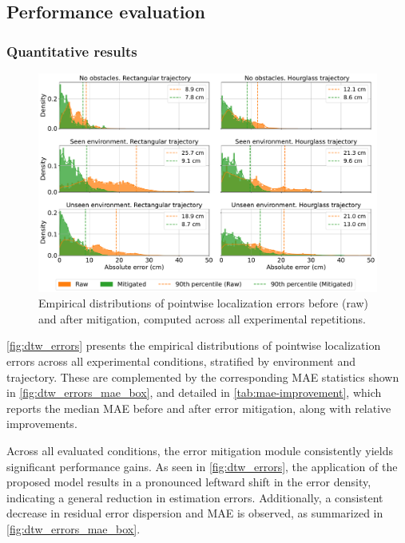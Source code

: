 \subsection{Performance evaluation}
\subsubsection{Quantitative results}

\begin{figure}[tbh]
    \centering
    \includegraphics[width=\textwidth]{Graphics/dtw_errors.pdf}
    \caption[Empirical distributions of localization errors before and after mitigation.]{Empirical distributions of pointwise localization errors before (raw) and after mitigation, computed across all experimental repetitions.}
    \label{fig:dtw_errors}
\end{figure}

\autoref{fig:dtw_errors} presents the empirical distributions of pointwise localization errors across all experimental conditions, stratified by environment and trajectory. These are complemented by the corresponding MAE statistics shown in \autoref{fig:dtw_errors_mae_box}, and detailed in \autoref{tab:mae-improvement}, which reports the median MAE before and after error mitigation, along with relative improvements.

Across all evaluated conditions, the error mitigation module consistently yields significant performance gains. As seen in \autoref{fig:dtw_errors}, the application of the proposed model results in a pronounced leftward shift in the error density, indicating a general reduction in estimation errors. Additionally, a consistent decrease in residual error dispersion and MAE is observed, as summarized in \autoref{fig:dtw_errors_mae_box}.

